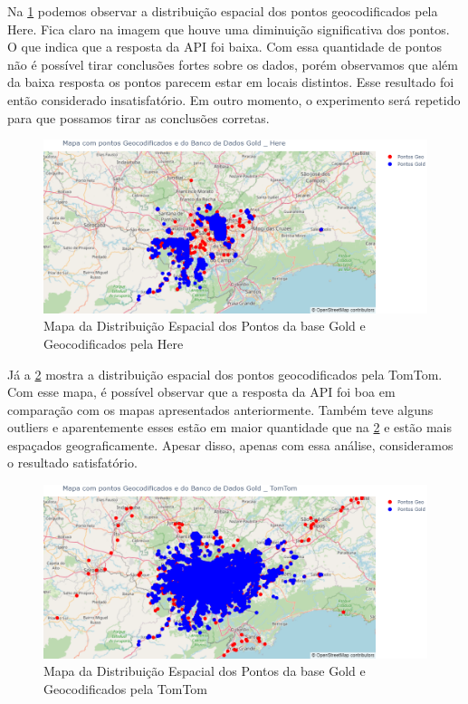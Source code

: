 Na \ref{fig:mapapontos2} podemos observar a distribuição espacial dos pontos geocodificados pela Here. Fica claro na imagem que houve uma diminuição significativa dos pontos. O que indica que a resposta da API foi baixa. Com essa quantidade de pontos não é possível tirar conclusões fortes sobre os dados, porém observamos que além da baixa resposta os pontos parecem estar em locais distintos. Esse resultado foi então considerado insatisfatório. Em outro momento, o experimento será repetido para que possamos tirar as conclusões corretas.

\begin{figure}[h]
  \centering
  \includegraphics[width=\textwidth]{Figuras/mapapontos2.png}
  \caption{Mapa da Distribuição Espacial dos Pontos da base Gold e Geocodificados pela Here}
  \label{fig:mapapontos2}
\end{figure}

Já a \ref{fig:mapapontos3} mostra a distribuição espacial dos pontos geocodificados pela TomTom. Com esse mapa, é possível observar que a resposta da API foi boa em comparação com os mapas apresentados anteriormente. Também teve alguns outliers e aparentemente esses estão em maior quantidade que na \ref{fig:mapapontos3} e estão mais espaçados geograficamente. Apesar disso, apenas com essa análise, consideramos o resultado satisfatório. 

\begin{figure}[h]
  \centering
  \includegraphics[width=\textwidth]{Figuras/mapapontos3.png}
  \caption{Mapa da Distribuição Espacial dos Pontos da base Gold e Geocodificados pela TomTom}
  \label{fig:mapapontos3}
\end{figure}



